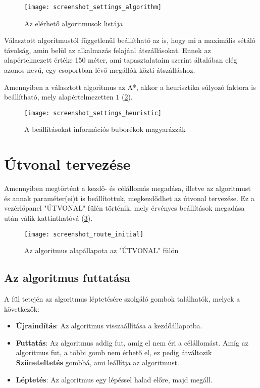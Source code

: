 \begin{figure}[H]
	\centering
	\texttt{[image: screenshot\_settings\_algorithm]}
	\caption{Az elérhető algoritmusok listája}
	\label{fig:screenshot-settings-algorithm}
\end{figure}

Választott algoritmustól függetlenül beállítható az is, hogy mi a maximális sétáló távolság, amin belül az alkalmazás felajánl átszállásokat. Ennek az alapértelmezett értéke 150 méter, ami tapasztalataim szerint általában elég azonos nevű, egy csoportban lévő megállók közti átszálláshoz.

Amennyiben a választott algoritmus az A*, akkor a heurisztika súlyozó faktora is beállítható, mely alapértelmezetten $1$ (\ref{fig:screenshot-settings-heuristic}).

\begin{figure}[H]
	\centering
	\texttt{[image: screenshot\_settings\_heuristic]}
	\caption{A beállításokat információs buborékok magyarázzák}
	\label{fig:screenshot-settings-heuristic}
\end{figure}

\section{Útvonal tervezése}

Amennyiben megtörtént a kezdő- és célállomás megadása, illetve az algoritmust és annak paraméter(ei)t is beállítottuk, megkezdődhet az útvonal tervezése. Ez a vezérlőpanel "ÚTVONAL" fülén történik, mely érvényes beállítások megadása után válik kattinthatóvá (\ref{fig:screenshot-route-initial}).

\begin{figure}[H]
	\centering
	\texttt{[image: screenshot\_route\_initial]}
	\caption{Az algoritmus alapállapota az "ÚTVONAL" fülön}
	\label{fig:screenshot-route-initial}
\end{figure}

\subsection{Az algoritmus futtatása}

A fül tetején az algoritmus léptetésére szolgáló gombok találhatók, melyek a következők:
\begin{itemize}
	\item \textbf{Újraindítás}: Az algoritmus visszaállítása a kezdőállapotba.
	\item \textbf{Futtatás}: Az algoritmus addig fut, amíg el nem éri a célállomást. Amíg az algoritmus fut, a többi gomb nem érhető el, ez pedig átváltozik \textbf{Szüneteltetés} gombbá, ami leállítja az algoritmust.
	\item \textbf{Léptetés}: Az algoritmus egy lépéssel halad előre, majd megáll.
\end{itemize}

